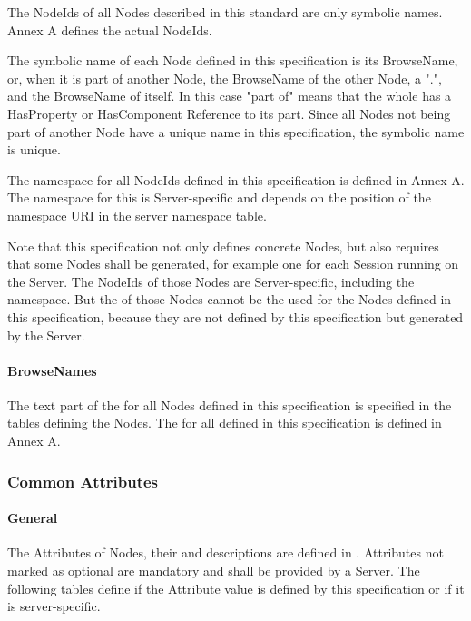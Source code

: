 The \glspl{NodeId} of all \glspl{Node} described in this standard are only symbolic names. Annex A defines the actual \glspl{NodeId}.

The symbolic name of each \gls{Node} defined in this specification is its \gls{BrowseName}, or, when it is part of another Node, the \gls{BrowseName} of the other \gls{Node}, a ".", and the \gls{BrowseName} of itself. In this case "part of" means that the whole has a \gls{HasProperty} or \gls{HasComponent} Reference to its part. Since all \glspl{Node} not being part of another \gls{Node} have a unique name in this specification, the symbolic name is unique.

The namespace for all \glspl{NodeId} defined in this specification is defined in Annex A. The namespace for this  is Server-specific and depends on the position of the namespace URI in the server namespace table.

Note that this specification not only defines concrete \glspl{Node}, but also requires that some Nodes shall be generated, for example one for each Session running on the Server. The \glspl{NodeId} of those \glspl{Node} are Server-specific, including the namespace. But the  of those \glspl{Node} cannot be the  used for the Nodes defined in this specification, because they are not defined by this specification but generated by the Server.

\paragraph{BrowseNames}
The text part of the  for all \gls{Node}s defined in this specification is specified in the tables defining the Nodes. The  for all  defined in this specification is defined in Annex A.

\subsubsection{Common Attributes}

\paragraph{General}
The \glspl{Attribute} of \glspl{Node}, their  and descriptions are defined in \cite{UAPart3}. \glspl{Attribute} not marked as optional are mandatory and shall be provided by a Server. The following tables define if the \gls{Attribute} value is defined by this specification or if it is server-specific.

